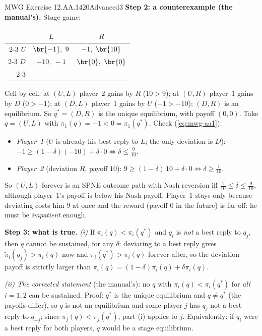 \begin{exsol}{MWG Exercise 12.AA.1}{420}{Advanced}{3}
\textbf{Step 2: a counterexample (the manual's).} Stage game:
\begin{center}
\begin{tabular}{r|c|c|}
\multicolumn{1}{r}{} & \multicolumn{1}{c}{$L$} & \multicolumn{1}{c}{$R$}\\ \cline{2-3}
$U$ & $\br{-1},\ 9$ & $-1,\ \br{10}$ \\ \cline{2-3}
$D$ & $-10,\ -1$ & $\br{0},\ \br{0}$ \\ \cline{2-3}
\end{tabular}
\end{center}
Cell by cell: at $(U,L)$ player~2 gains by $R$ ($10 > 9$); at $(U,R)$ player~1 gains by $D$ ($0 > -1$); at $(D,L)$ player~1 gains by $U$ ($-1 > -10$); $(D,R)$ is an equilibrium. So $q^* = (D,R)$ is the unique equilibrium, with payoff $(0,0)$. 
Take
$q = (U,L)$ with $\pi_1(q) = -1 < 0 = \pi_1(q^*)$. Check (\ref{eq:mwg-aa1}):
\begin{itemize}
  \item \emph{Player~1} ($U$ is already his best reply to $L$; the only deviation is $D$):
  $-1 \ge (1-\delta)(-10) + \delta\cdot0 \iff \delta \le \frac{9}{10}$.
  \item \emph{Player~2} (deviation $R$, payoff $10$): $9 \ge (1-\delta)\,10 + \delta\cdot 0 \iff \delta \ge \frac1{10}$.
\end{itemize}
So $(U,L)$ forever is an SPNE outcome path with Nash reversion iff $\frac1{10} \le \delta \le \frac9{10}$, although
player~1's payoff is below his Nash payoff. Player~1 stays only because deviating costs him $9$ at once
and the reward (payoff $0$ in the future) is far off: he must be \emph{impatient} enough.

\textbf{Step 3: what is true.}
\emph{(i)} If $\pi_i(q) < \pi_i(q^*)$ and $q_i$ is \emph{not} a best reply to $q_j$, then $q$ cannot be
sustained, for any $\delta$: deviating to a best reply gives $\tilde\pi_i(q_j) > \pi_i(q)$ now and
$\pi_i(q^*) > \pi_i(q)$ forever after, so the deviation payoff is strictly larger than
$\pi_i(q) = (1-\delta)\pi_i(q) + \delta\pi_i(q)$.

\emph{(ii) The corrected statement} (the manual's): no $q$ with $\pi_i(q) < \pi_i(q^*)$ for \emph{all}
$i = 1,2$ can be sustained. Proof: $q^*$ is the unique equilibrium and $q \ne q^*$ (the payoffs differ), so $q$
is not an equilibrium and some player $j$ has $q_j$ not a best reply to $q_{-j}$; since
$\pi_j(q) < \pi_j(q^*)$, part (i) applies to $j$. Equivalently: if $q_i$ were a best reply for both players,
$q$ would be a stage equilibrium.


\end{exsol}
